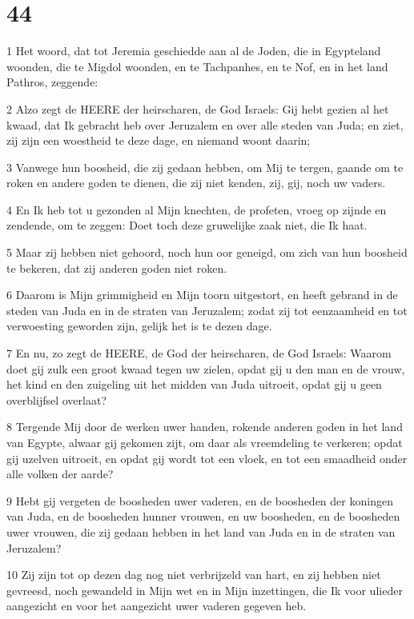 \chapter{44}

\par 1 Het woord, dat tot Jeremia geschiedde aan al de Joden, die in Egypteland woonden, die te Migdol woonden, en te Tachpanhes, en te Nof, en in het land Pathros, zeggende:
\par 2 Alzo zegt de HEERE der heirscharen, de God Israels: Gij hebt gezien al het kwaad, dat Ik gebracht heb over Jeruzalem en over alle steden van Juda; en ziet, zij zijn een woestheid te deze dage, en niemand woont daarin;
\par 3 Vanwege hun boosheid, die zij gedaan hebben, om Mij te tergen, gaande om te roken en andere goden te dienen, die zij niet kenden, zij, gij, noch uw vaders.
\par 4 En Ik heb tot u gezonden al Mijn knechten, de profeten, vroeg op zijnde en zendende, om te zeggen: Doet toch deze gruwelijke zaak niet, die Ik haat.
\par 5 Maar zij hebben niet gehoord, noch hun oor geneigd, om zich van hun boosheid te bekeren, dat zij anderen goden niet roken.
\par 6 Daarom is Mijn grimmigheid en Mijn toorn uitgestort, en heeft gebrand in de steden van Juda en in de straten van Jeruzalem; zodat zij tot eenzaamheid en tot verwoesting geworden zijn, gelijk het is te dezen dage.
\par 7 En nu, zo zegt de HEERE, de God der heirscharen, de God Israels: Waarom doet gij zulk een groot kwaad tegen uw zielen, opdat gij u den man en de vrouw, het kind en den zuigeling uit het midden van Juda uitroeit, opdat gij u geen overblijfsel overlaat?
\par 8 Tergende Mij door de werken uwer handen, rokende anderen goden in het land van Egypte, alwaar gij gekomen zijt, om daar als vreemdeling te verkeren; opdat gij uzelven uitroeit, en opdat gij wordt tot een vloek, en tot een smaadheid onder alle volken der aarde?
\par 9 Hebt gij vergeten de boosheden uwer vaderen, en de boosheden der koningen van Juda, en de boosheden hunner vrouwen, en uw boosheden, en de boosheden uwer vrouwen, die zij gedaan hebben in het land van Juda en in de straten van Jeruzalem?
\par 10 Zij zijn tot op dezen dag nog niet verbrijzeld van hart, en zij hebben niet gevreesd, noch gewandeld in Mijn wet en in Mijn inzettingen, die Ik voor ulieder aangezicht en voor het aangezicht uwer vaderen gegeven heb.
